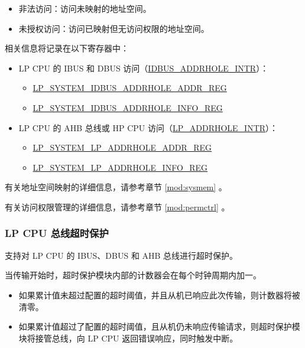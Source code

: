 \documentclass[main\_\_CN.tex]{subfiles}
\begin{document}
\begin{itemize}
    \item 非法访问：访问未映射的地址空间。
    \item 未授权访问：访问已映射但无访问权限的地址空间。
\end{itemize}

相关信息将记录在以下寄存器中：

\begin{itemize}
    \item LP CPU 的 IBUS 和 DBUS 访问（\hyperref[tab:sysreg-int-sources]{IDBUS\_ADDRHOLE\_INTR}）：
    \begin{itemize}
            \item \hyperref[regdesc:LPSYSTEMIDBUSADDRHOLEADDRREG]{LP\_SYSTEM\_IDBUS\_ADDRHOLE\_ADDR\_REG}\\
            \item \hyperref[regdesc:LPSYSTEMIDBUSADDRHOLEINFOREG]{LP\_SYSTEM\_IDBUS\_ADDRHOLE\_INFO\_REG}\\
    \end{itemize}
    \item LP CPU 的 AHB 总线或 HP CPU 访问（\hyperref[tab:sysreg-int-sources]{LP\_ADDRHOLE\_INTR}）：
    \begin{itemize}
            \item \hyperref[regdesc:LPSYSTEMLPADDRHOLEADDRREG]{LP\_SYSTEM\_LP\_ADDRHOLE\_ADDR\_REG}\\
            \item \hyperref[regdesc:LPSYSTEMLPADDRHOLEINFOREG]{LP\_SYSTEM\_LP\_ADDRHOLE\_INFO\_REG}\\
    \end{itemize}
\end{itemize}

有关地址空间映射的详细信息，请参考章节 \ref{mod:sysmem} \textit{}。

有关访问权限管理的详细信息，请参考章节 \ref{mod:permctrl} \textit{}。


\subsubsection{LP CPU 总线超时保护}

\chipname{} 支持对 LP CPU 的 IBUS、DBUS 和 AHB 总线进行超时保护。

当传输开始时，超时保护模块内部的计数器会在每个时钟周期内加一。

\begin{itemize}
    \item 如果累计值未超过配置的超时阈值，并且从机已响应此次传输，则计数器将被清零。
    \item 如果累计值超过了配置的超时阈值，且从机仍未响应传输请求，则超时保护模块将接管总线，向 LP CPU 返回错误响应，同时触发中断。
\end{itemize}
\end{document}
